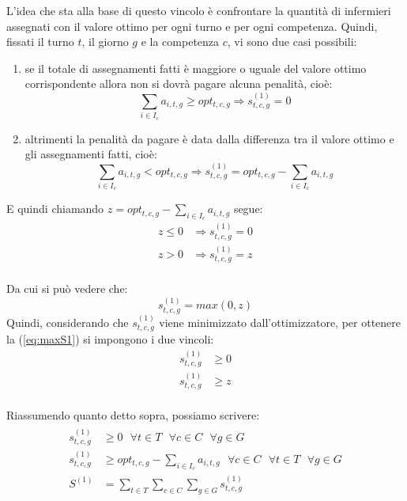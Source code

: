 L'idea che sta alla base di questo vincolo è confrontare la quantità di infermieri assegnati con il valore ottimo per ogni turno e per ogni competenza.
Quindi, fissati il turno $t$, il giorno $g$ e la competenza $c$, vi sono due casi possibili:
\begin{enumerate}
\item se il totale di assegnamenti fatti è maggiore o uguale del valore ottimo corrispondente allora non si dovrà pagare alcuna penalità, cioè:
\begin{equation}
\sum_{i \in I_c} a_{i, t, g} \geq opt_{t,c,g} \Longrightarrow s^{(1)}_{t, c, g} = 0
\end{equation}
\item altrimenti la penalità da pagare è data dalla differenza tra il valore ottimo e gli assegnamenti fatti, cioè: 
\begin{equation}
\sum_{i \in I_c} a_{i, t, g} < opt_{t,c,g} \Longrightarrow s^{(1)}_{t, c, g} = opt_{t,c,g} - \sum_{i \in I_c} a_{i, t, g}
\end{equation}
\end{enumerate}

E quindi chiamando $z = opt_{t,c,g} - \sum_{i \in I_c} a_{i, t, g}$ segue:
\begin{equation}
\begin{split}
z \leq 0 &\Longrightarrow s^{(1)}_{t, c, g} = 0 \\
z > 0 &\Longrightarrow s^{(1)}_{t, c, g} = z \\
\end{split}
\end{equation}

Da cui si può vedere che:
\begin{equation}
\label{eq:maxS1}
s^{(1)}_{t, c, g} = max(0, z)
\end{equation}
Quindi, considerando che $s^{(1)}_{t, c, g}$ viene minimizzato dall'ottimizzatore, per ottenere la (\ref{eq:maxS1}) si impongono i due vincoli:
\begin{equation}
\begin{split}
s^{(1)}_{t, c, g} &\geq 0 \\
s^{(1)}_{t, c, g} &\geq z \\
\end{split}
\end{equation}

Riassumendo quanto detto sopra, possiamo scrivere:
\begin{gather}
\begin{aligned}
s^{(1)}_{t, c, g} &\geq 0 ~~~ \forall t \in T ~~~ \forall c \in C ~~~ \forall g \in G \\
s^{(1)}_{t, c, g} &\geq opt_{t,c,g} - \sum_{i \in I_c} a_{i, t, g} ~~~ \forall c \in C ~~~ \forall t \in T ~~~ \forall g \in G \\
S^{(1)}  &=  \sum_{t \in T} \sum_{c \in C} \sum_{g \in G} s^{(1)}_{t, c, g} \\
\end{aligned}
\end{gather}

